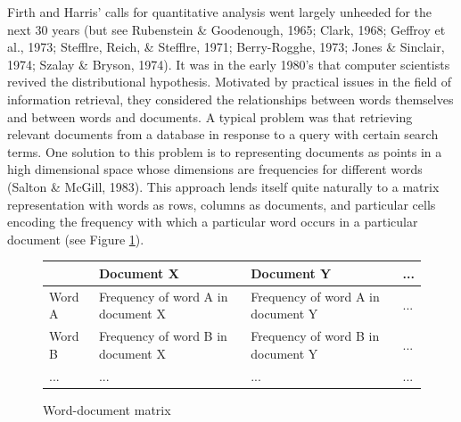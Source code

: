 \documentclass[man,floatsintext]{apa6}
\begin{document}
Firth and Harris' calls for quantitative analysis went largely unheeded for the next 30 years (but see Rubenstein \& Goodenough, 1965; Clark, 1968; Geffroy et al., 1973; Stefflre, Reich, \& Stefflre, 1971; Berry-Rogghe, 1973; Jones \& Sinclair, 1974; Szalay \& Bryson, 1974). It was in the early 1980's that computer scientists revived the distributional hypothesis. Motivated by practical issues in the field of information retrieval, they considered the relationships between words themselves and between words and documents. A typical problem was that retrieving relevant documents from a database in response to a query with certain search terms. One solution to this problem is to representing documents as points in a high dimensional space whose dimensions are frequencies for different words (Salton \& McGill, 1983). This approach lends itself quite naturally to a matrix representation with words as rows, columns as documents, and particular cells encoding the frequency with which a particular word occurs in a particular document (see Figure \ref{matrix-word-doc}).

\begin{figure}
  \begin{center}
    \caption{Word-document matrix}
    \label{matrix-word-doc}

    \begin{tabular}{| l | p{4cm} | p{4cm} | l |}
      \hline
      & Document X & Document Y & ... \\
      \hline
      Word A & Frequency of word A \newline in document X & Frequency of word A \newline in document Y & ... \\
      \hline
      Word B & Frequency of word B \newline in document X & Frequency of word B \newline in document Y & ... \\
      \hline
      ... & ... & ... & ... \\
      \hline

    \end{tabular}
  \end{center}
\end{figure}
\end{document}

